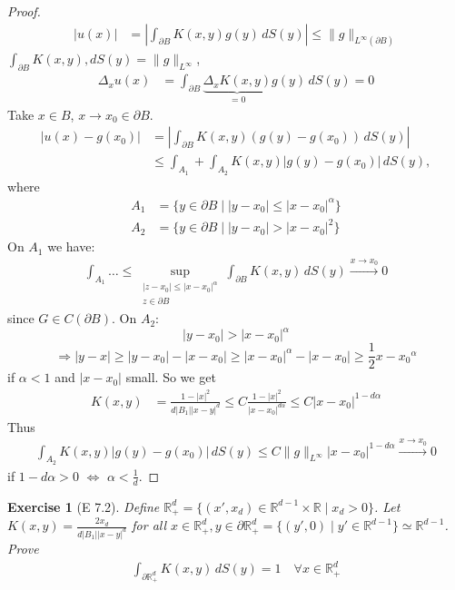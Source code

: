 \documentclass{report}
\theoremstyle{tommy}
\newtheorem{ex}[defn]{Exercise}
\begin{document}
\begin{proof}
    \begin{align*}
      |u(x)| &= \left| \int_{\partial B}K(x,y) g(y) \, dS(y) \right| \le \|g\|_{L^\infty(\partial B)}
    \end{align*}
    \(\int_{\partial B} K(x,y) , dS(y) = \|g\|_{L^\infty}\), 
    \begin{align*}
      \Delta_x u(x) &= \int_{\partial B} \underbrace{\Delta_x K(x,y)}_{= 0} g(y) \, dS(y) = 0
    \end{align*}
    Take \(x \in B\), \(x \to x_0 \in \partial B\).
    \begin{align*}
      |u(x) - g(x_0)| 
      &= \left| \int_{\partial B} K(x,y)(g(y) - g(x_0)) \, dS(y) \right| \\
      &\le \int_{A_1} + \int_{A_2} K(x,y) |g(y) - g(x_0)| \, dS(y),
    \end{align*}
    where
    \begin{align*}
      A_1 &= \{y \in \partial B \mid |y - x_0| \le |x-x_0|^\alpha\} \\
      A_2 &= \{y \in \partial B \mid |y-x_0| > |x-x_0|^2\}
    \end{align*}
    On \(A_1\) we have:
    \begin{align*}
      \int_{A_1} \dots \le \sup_{\substack{|z-x_0| \le |x-x_0|^\alpha \\ z \in \partial B}} \int_{\partial B} K(x,y) \, dS(y) \xrightarrow{x \to x_0} 0
    \end{align*}
    since \(G \in C(\partial B)\). On \(A_2\):
    \[
      |y-x_0| > |x-x_0|^\alpha
    \]
    \[
      \Rightarrow |y-x| \ge |y-x_0|-|x-x_0| \ge |x-x_0|^\alpha - |x-x_0| \ge \frac{1}{2} {x-x_0}^\alpha
    \]
    if \(\alpha < 1\) and \(|x-x_0|\) small. So we get 
    \begin{align*}
      K(x,y) &= \frac{1-|x|^2}{d|B_1||x-y|^d} \le C \frac{1-|x|^2}{|x-x_0|^{d\alpha}} \le C |x-x_0|^{1-d\alpha}
    \end{align*}
    Thus 
    \begin{align*}
      \int_{A_2} K(x,y) |g(y)-g(x_0)| \, dS(y) \le C \|g\|_{L^\infty} |x-x_0|^{1-d\alpha} \xrightarrow{x \to x_0} 0
    \end{align*}
    if \(1 - d\alpha > 0\) \(\Leftrightarrow\) \(\alpha < \frac{1}{d}\).
  \end{proof}

  \begin{ex}[E 7.2]
    Define \(\mathbb{R}_+^d = \{(x', x_d) \in \mathbb{R}^{d-1} \times \mathbb{R} \mid x_d > 0\}\). Let \(K(x,y) = \frac{2 x_d}{d |B_1| |x-y|^d}\) for all \(x \in \mathbb{R}_+^d, y \in \partial \mathbb{R}_+^d = \{(y', 0) \mid y' \in \mathbb{R}^{d-1}\} \simeq \mathbb{R}^{d-1}\). Prove
    \begin{align*}
      \int_{\partial \mathbb{R}_+^d} K(x,y) \, dS(y) = 1 \quad \forall x \in \mathbb{R}_+^d
    \end{align*}
  \end{ex}
\end{document}
